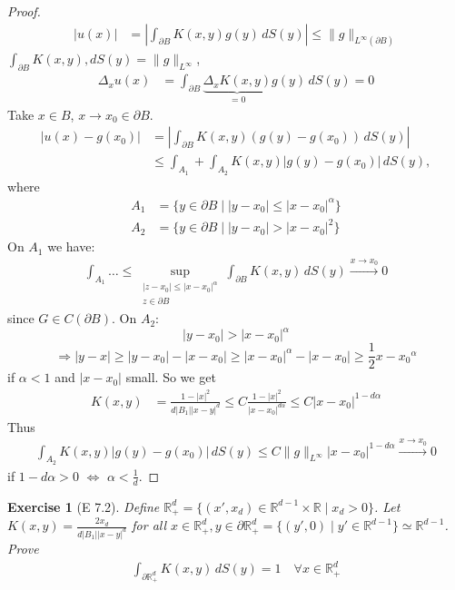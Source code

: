 \documentclass{report}
\theoremstyle{tommy}
\newtheorem{ex}[defn]{Exercise}
\begin{document}
\begin{proof}
    \begin{align*}
      |u(x)| &= \left| \int_{\partial B}K(x,y) g(y) \, dS(y) \right| \le \|g\|_{L^\infty(\partial B)}
    \end{align*}
    \(\int_{\partial B} K(x,y) , dS(y) = \|g\|_{L^\infty}\), 
    \begin{align*}
      \Delta_x u(x) &= \int_{\partial B} \underbrace{\Delta_x K(x,y)}_{= 0} g(y) \, dS(y) = 0
    \end{align*}
    Take \(x \in B\), \(x \to x_0 \in \partial B\).
    \begin{align*}
      |u(x) - g(x_0)| 
      &= \left| \int_{\partial B} K(x,y)(g(y) - g(x_0)) \, dS(y) \right| \\
      &\le \int_{A_1} + \int_{A_2} K(x,y) |g(y) - g(x_0)| \, dS(y),
    \end{align*}
    where
    \begin{align*}
      A_1 &= \{y \in \partial B \mid |y - x_0| \le |x-x_0|^\alpha\} \\
      A_2 &= \{y \in \partial B \mid |y-x_0| > |x-x_0|^2\}
    \end{align*}
    On \(A_1\) we have:
    \begin{align*}
      \int_{A_1} \dots \le \sup_{\substack{|z-x_0| \le |x-x_0|^\alpha \\ z \in \partial B}} \int_{\partial B} K(x,y) \, dS(y) \xrightarrow{x \to x_0} 0
    \end{align*}
    since \(G \in C(\partial B)\). On \(A_2\):
    \[
      |y-x_0| > |x-x_0|^\alpha
    \]
    \[
      \Rightarrow |y-x| \ge |y-x_0|-|x-x_0| \ge |x-x_0|^\alpha - |x-x_0| \ge \frac{1}{2} {x-x_0}^\alpha
    \]
    if \(\alpha < 1\) and \(|x-x_0|\) small. So we get 
    \begin{align*}
      K(x,y) &= \frac{1-|x|^2}{d|B_1||x-y|^d} \le C \frac{1-|x|^2}{|x-x_0|^{d\alpha}} \le C |x-x_0|^{1-d\alpha}
    \end{align*}
    Thus 
    \begin{align*}
      \int_{A_2} K(x,y) |g(y)-g(x_0)| \, dS(y) \le C \|g\|_{L^\infty} |x-x_0|^{1-d\alpha} \xrightarrow{x \to x_0} 0
    \end{align*}
    if \(1 - d\alpha > 0\) \(\Leftrightarrow\) \(\alpha < \frac{1}{d}\).
  \end{proof}

  \begin{ex}[E 7.2]
    Define \(\mathbb{R}_+^d = \{(x', x_d) \in \mathbb{R}^{d-1} \times \mathbb{R} \mid x_d > 0\}\). Let \(K(x,y) = \frac{2 x_d}{d |B_1| |x-y|^d}\) for all \(x \in \mathbb{R}_+^d, y \in \partial \mathbb{R}_+^d = \{(y', 0) \mid y' \in \mathbb{R}^{d-1}\} \simeq \mathbb{R}^{d-1}\). Prove
    \begin{align*}
      \int_{\partial \mathbb{R}_+^d} K(x,y) \, dS(y) = 1 \quad \forall x \in \mathbb{R}_+^d
    \end{align*}
  \end{ex}
\end{document}
